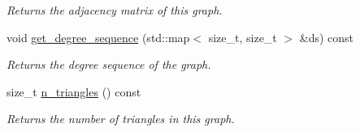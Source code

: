 \begin{DoxyCompactItemize}
\begin{DoxyCompactList}\small\item\em Returns the adjacency matrix of this graph. \end{DoxyCompactList}\item 
void \hyperlink{classlgraph_1_1xxgraph_ad83dc5e5687dd334b56af426adbbd04b}{get\-\_\-degree\-\_\-sequence} (std\-::map$<$ size\-\_\-t, size\-\_\-t $>$ \&ds) const 
\begin{DoxyCompactList}\small\item\em Returns the degree sequence of the graph. \end{DoxyCompactList}\item 
size\-\_\-t \hyperlink{classlgraph_1_1xxgraph_a6aa54c191500b3fc952ec0d5e897dc1a}{n\-\_\-triangles} () const 
\begin{DoxyCompactList}\small\item\em Returns the number of triangles in this graph. \end{DoxyCompactList}\end{DoxyCompactItemize}
